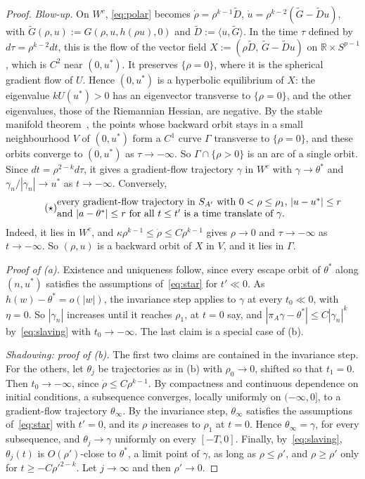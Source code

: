 \documentclass[11pt]{article}
\theoremstyle{definition}
\theoremstyle{remark}
\newcommand{\R}{\mathbb{R}}
\newcommand{\ip}[2]{\langle #1,#2\rangle}
\begin{document}
\begin{proof}
\emph{Blow-up.} On $W^c$, \eqref{eq:polar} becomes $\dot\rho=\rho^{k-1}\tilde D$, $\dot u=\rho^{k-2}(\tilde G-\tilde Du)$, with $\tilde G(\rho,u):=G(\rho,u,h(\rho u),0)$ and $\tilde D:=\ip{u}{\tilde G}$. In the time $\tau$ defined by $d\tau=\rho^{k-2}dt$, this is the flow of the vector field $X:=(\rho\tilde D,\,\tilde G-\tilde Du)$ on $\R\times S^{p-1}$, which is $C^2$ near $(0,u^*)$. It preserves $\{\rho=0\}$, where it is the spherical gradient flow of $U$. Hence $(0,u^*)$ is a hyperbolic equilibrium of $X$: the eigenvalue $kU(u^*)>0$ has an eigenvector transverse to $\{\rho=0\}$, and the other eigenvalues, those of the Riemannian Hessian, are negative. By the stable manifold theorem~\cite[Theorems~9.4 and~9.5]{Tes12}, the points whose backward orbit stays in a small neighbourhood $V$ of $(0,u^*)$ form a $C^1$ curve $\Gamma$ transverse to $\{\rho=0\}$, and these orbits converge to $(0,u^*)$ as $\tau\to-\infty$. So $\Gamma\cap\{\rho>0\}$ is an arc of a single orbit. Since $dt=\rho^{2-k}d\tau$, it gives a gradient-flow trajectory $\gamma$ in $W^c$ with $\gamma\to\theta^*$ and $\gamma_n/|\gamma_n|\to u^*$ as $t\to-\infty$. Conversely,
\begin{equation}\tag{$\star$}\label{eq:star}
\parbox{0.84\textwidth}{every gradient-flow trajectory in $S_{A'}$ with $0<\rho\le\rho_1$, $|u-u^*|\le r$ and $|a-\theta^*|\le r$ for all $t\le t'$ is a time translate of $\gamma$.}
\end{equation}
Indeed, it lies in $W^c$, and $\kappa\rho^{k-1}\le\dot\rho\le C\rho^{k-1}$ gives $\rho\to0$ and $\tau\to-\infty$ as $t\to-\infty$. So $(\rho,u)$ is a backward orbit of $X$ in $V$, and it lies in $\Gamma$.

\emph{Proof of \textup{(a)}.} Existence and uniqueness follow, since every escape orbit of $\theta^*$ along $(n,u^*)$ satisfies the assumptions of~\eqref{eq:star} for $t'\ll0$. As $h(w)-\theta^*=o(|w|)$, the invariance step applies to $\gamma$ at every $t_0\ll0$, with $\eta=0$. So $|\gamma_n|$ increases until it reaches $\rho_1$, at $t=0$ say, and $|\pi_A\gamma-\theta^*|\le C|\gamma_n|^k$ by~\eqref{eq:slaving} with $t_0\to-\infty$. The last claim is a special case of (b).

\emph{Shadowing: proof of \textup{(b)}.} The first two claims are contained in the invariance step. For the others, let $\theta_j$ be trajectories as in (b) with $\rho_0\to0$, shifted so that $t_1=0$. Then $t_0\to-\infty$, since $\dot\rho\le C\rho^{k-1}$. By compactness and continuous dependence on initial conditions, a subsequence converges, locally uniformly on $(-\infty,0]$, to a gradient-flow trajectory $\theta_\infty$. By the invariance step, $\theta_\infty$ satisfies the assumptions of~\eqref{eq:star} with $t'=0$, and its $\rho$ increases to $\rho_1$ at $t=0$. Hence $\theta_\infty=\gamma$, for every subsequence, and $\theta_j\to\gamma$ uniformly on every $[-T,0]$. Finally, by~\eqref{eq:slaving}, $\theta_j(t)$ is $O(\rho')$-close to $\theta^*$, a limit point of $\gamma$, as long as $\rho\le\rho'$, and $\rho\ge\rho'$ only for $t\ge-C\rho'^{2-k}$. Let $j\to\infty$ and then $\rho'\to0$.
\end{proof}
\end{document}
